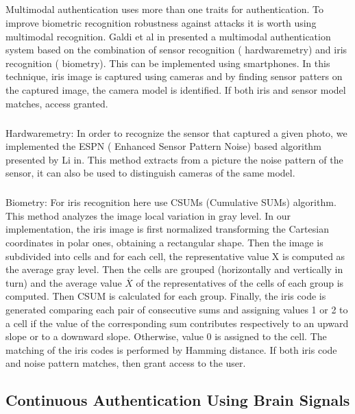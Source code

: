 \documentclass[10pt,a4paper,journal]{IEEEtran}
\begin{document}
\subparagraph{} Multimodal authentication uses more than one traits for authentication. To improve biometric recognition robustness against attacks it is worth using multimodal recognition. Galdi et al in \cite{5} presented a multimodal authentication system  based on the combination of sensor recognition ( hardwaremetry) and iris recognition ( biometry). This can be implemented using smartphones. In this technique, iris image is captured using cameras and by finding sensor patters on the captured image, the camera model is identified. If both iris and sensor model matches, access granted.
\subparagraph{}Hardwaremetry: In order to recognize the sensor that captured a given photo, we implemented the ESPN ( Enhanced Sensor Pattern Noise) based algorithm presented by Li in\cite{6}. This method extracts from a picture the noise pattern of the sensor, it can also be used to distinguish cameras of the same model.
\subparagraph{}Biometry: For iris recognition here use CSUMs (Cumulative SUMs) algorithm\cite{7}. This method analyzes the image local variation in gray level. In our implementation, the iris image is ﬁrst normalized transforming the Cartesian coordinates in polar ones, obtaining a rectangular shape. Then the image is subdivided into cells and for each cell, the representative value X is computed as the  average  gray  level.  Then  the  cells are grouped (horizontally and vertically in turn) and the average value $\overline{X}$  of  the  representatives  of  the  cells  of  each  group is  computed.
Then CSUM is calculated for each group. Finally, the iris code is generated comparing each pair of consecutive sums and assigning values 1 or 2 to a cell if the value of the corresponding sum contributes respectively to an upward slope or to a downward slope. Otherwise, value 0 is assigned to the cell. The matching of the iris codes is performed by Hamming distance. If both iris code and noise pattern matches, then grant access to the user. 



\subsection{Continuous Authentication Using Brain Signals}
\end{document}
